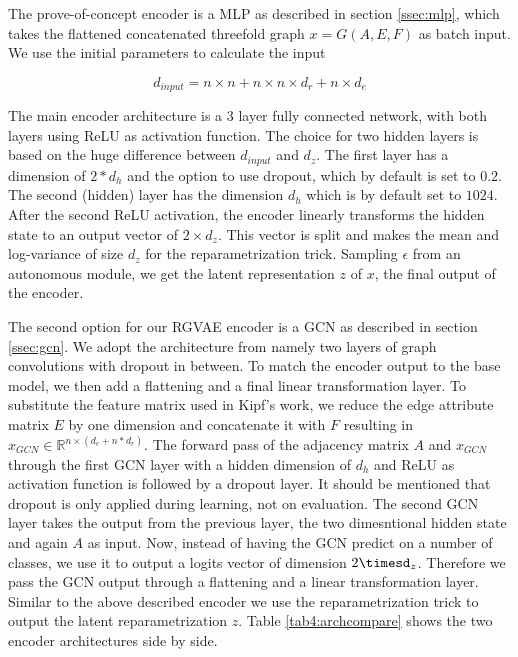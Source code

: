 The prove-of-concept encoder is a MLP as described in section \ref{ssec:mlp}, which takes the flattened concatenated threefold graph $x=G(A,E,F)$ as batch input. We use the initial parameters to calculate the input

\begin{equation}
    d_{input} = n\times n + n\times n\times d_r + n\times d_e
    \label{eq4:inputdim}
\end{equation}

The main encoder architecture is a 3 layer fully connected network, with both layers using ReLU as activation function. The choice for two hidden layers is based on the huge difference between $d_{input}$ and $d_z$. The first layer has a dimension of $2*d_h$ and the option to use dropout, which by default is set to $0.2$. The second (hidden) layer has the dimension $d_h$ which is by default set to $1024$. After the second ReLU activation, the encoder linearly transforms the hidden state to an output vector of $2 \times d_z$. This vector is split and makes the mean and log-variance of size $d_z$ for the reparametrization trick. Sampling $\epsilon$ from an autonomous module, we get the latent representation $z$ of $x$,  the final output of the encoder.

The second option for our RGVAE encoder is a GCN as described in section \ref{ssec:gcn}. We adopt the architecture from \cite{kipf_semi-supervised_2017} namely two layers of graph convolutions with dropout in between. To match the encoder output to the base model, we then add a flattening and a final linear transformation layer. To substitute the feature matrix used in Kipf's work, we reduce the edge attribute matrix $E$ by one dimension and concatenate it with $F$ resulting in $x_{GCN} \in \mathbb{R}^{n \times (d_e+n*d_r)}$. The forward pass of the adjacency matrix $A$ and $x_{GCN}$ through the first GCN layer with a hidden dimension of $d_h$ and ReLU as activation function is followed by a dropout layer. It should be mentioned that dropout is only applied during learning, not on evaluation. The second GCN layer takes the output from the previous layer, the two dimesntional hidden state and again $A$ as input. Now, instead of having the GCN predict on a number of classes, we use it to output a logits vector of dimension $2\timesd_z$. Therefore we pass the GCN output through a flattening and a linear transformation layer. Similar to the above described encoder we use the reparametrization trick to output the latent reparametrization $z$. Table \ref{tab4:archcompare} shows the two encoder architectures side by side.


